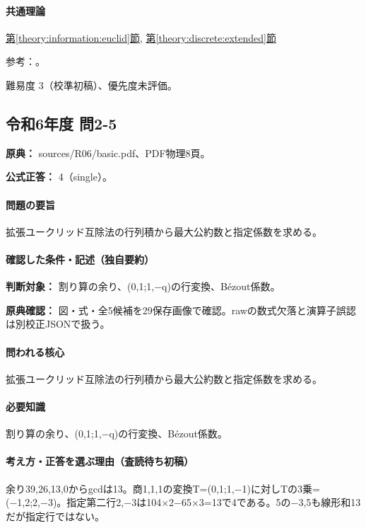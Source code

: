 \paragraph{共通理論} \hyperref[theory:information:euclid]{第\ref*{theory:information:euclid}節}, \hyperref[theory:discrete:extended]{第\ref*{theory:discrete:extended}節}

\par 参考：\cite{mit_discrete2015}。

\par 難易度 3（校準初稿）、優先度未評価。

\subsection{令和6年度 問2-5}
\label{q:r06-reg-basic-2-5}

\noindent\textbf{原典：} sources/R06/basic.pdf、PDF物理8頁。

\textbf{公式正答：} 4（single）。

\paragraph{問題の要旨} 拡張ユークリッド互除法の行列積から最大公約数と指定係数を求める。

\paragraph{確認した条件・記述（独自要約）}\mbox{}\par

\noindent\textbf{判断対象：} 割り算の余り、(0,1;1,−q)の行変換、Bézout係数。\par

\noindent\textbf{原典確認：} 図・式・全5候補を29保存画像で確認。rawの数式欠落と演算子誤認は別校正JSONで扱う。\par

\paragraph{問われる核心} 拡張ユークリッド互除法の行列積から最大公約数と指定係数を求める。

\paragraph{必要知識} 割り算の余り、(0,1;1,−q)の行変換、Bézout係数。

\paragraph{考え方・正答を選ぶ理由（査読待ち初稿）} 余り39,26,13,0からgcdは13。商1,1,1の変換T=\allowbreak{}(0,1;1,−1)に対しTの3乗=(−1,2;2,−3)。指定第二行2,−3は104×2−65×3=\allowbreak{}13で4である。5の−3,5も線形和13だが指定行ではない。

